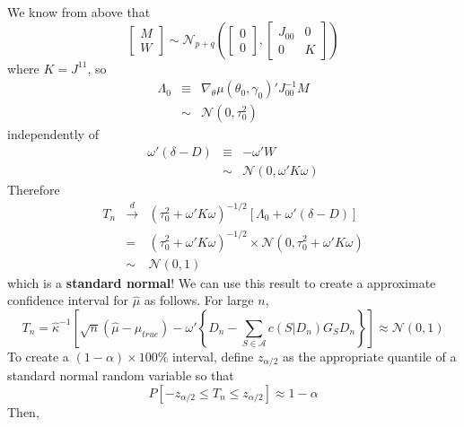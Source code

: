 We know from above that
	$$
	\left[\begin{array}{c}
		M\\
		W
	\end{array}\right] \sim \mathcal{N}_{p+q}\left(
	\left[\begin{array}{c}
		0\\
		0
	\end{array}\right],
	\left[\begin{array}{cc}
		J_{00}&0\\
		0&K
	\end{array}\right]\right)
$$
where $K = J^{11}$, so
	\begin{eqnarray*}
		\Lambda_0 &\equiv& \nabla_\theta \mu(\theta_0,\gamma_0)' J_{00}^{-1} M\\
			&\sim&  \mathcal{N}\left(0, \tau_0^2\right)
\end{eqnarray*}
independently of
	\begin{eqnarray*}
		\omega'\left( \delta - D\right)&\equiv&- \omega'W\\
			&\sim& \mathcal{N}\left(0, \omega'K\omega \right)
\end{eqnarray*}
Therefore
	\begin{eqnarray*}
		T_n &\overset{d}{\rightarrow}& (\tau_0^2 + \omega' K \omega)^{-1/2}\left[\Lambda_0 + \omega'\left( \delta - D\right)\right] \\
		&=& (\tau_0^2 + \omega' K \omega)^{-1/2} \times \mathcal{N}\left(0, \tau_0^2 + \omega'K\omega\right)\\
		&\sim& \mathcal{N}\left(0,1 \right)
\end{eqnarray*}
which is a \textbf{standard normal}! We can use this result to create a approximate confidence interval for $\hat{\mu}$ as follows. For large $n$, 
	$$T_n =\widehat{\kappa}^{-1}\left[\sqrt{n}(\hat{\mu} - \mu_{true})  - \omega'\left\{D_n -  \sum_{S\in \mathcal{A}} c(S|D_n)G_S D_n \right\} \right] \approx \mathcal{N}(0,1)$$
To create a $(1-\alpha)\times 100\%$ interval, define $z_{\alpha/2}$ as the appropriate quantile of a standard normal random variable so that
	$$P \left[-z_{\alpha/2} \leq T_n \leq z_{\alpha/2} \right] \approx 1-\alpha $$
Then,
